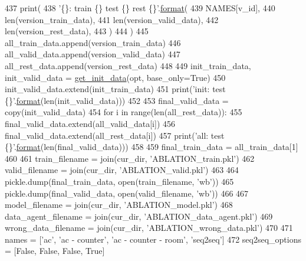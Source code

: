 \begin{DoxyCode}
437         print(
438             \textcolor{stringliteral}{'\{\}: train \{\} test \{\} rest \{\}'}.\hyperlink{namespaceparlai_1_1chat__service_1_1services_1_1messenger_1_1shared__utils_a32e2e2022b824fbaf80c747160b52a76}{format}(
439                 NAMES[v\_id],
440                 len(version\_train\_data),
441                 len(version\_valid\_data),
442                 len(version\_rest\_data),
443             )
444         )
445         all\_train\_data.append(version\_train\_data)
446         all\_valid\_data.append(version\_valid\_data)
447         all\_rest\_data.append(version\_rest\_data)
448 
449     init\_train\_data, init\_valid\_data = \hyperlink{namespaceprojects_1_1mastering__the__dungeon_1_1mturk_1_1tasks_1_1MTD_1_1run_ae84843b54586b020d47c60d95340e1d7}{get\_init\_data}(opt, base\_only=\textcolor{keyword}{True})
450     init\_valid\_data.extend(init\_train\_data)
451     print(\textcolor{stringliteral}{'init: test \{\}'}.\hyperlink{namespaceparlai_1_1chat__service_1_1services_1_1messenger_1_1shared__utils_a32e2e2022b824fbaf80c747160b52a76}{format}(len(init\_valid\_data)))
452 
453     final\_valid\_data = copy(init\_valid\_data)
454     \textcolor{keywordflow}{for} i \textcolor{keywordflow}{in} range(len(all\_rest\_data)):
455         final\_valid\_data.extend(all\_valid\_data[i])
456         final\_valid\_data.extend(all\_rest\_data[i])
457     print(\textcolor{stringliteral}{'all: test \{\}'}.\hyperlink{namespaceparlai_1_1chat__service_1_1services_1_1messenger_1_1shared__utils_a32e2e2022b824fbaf80c747160b52a76}{format}(len(final\_valid\_data)))
458 
459     final\_train\_data = all\_train\_data[1]
460 
461     train\_filename = join(cur\_dir, \textcolor{stringliteral}{'ABLATION\_train.pkl'})
462     valid\_filename = join(cur\_dir, \textcolor{stringliteral}{'ABLATION\_valid.pkl'})
463 
464     pickle.dump(final\_train\_data, open(train\_filename, \textcolor{stringliteral}{'wb'}))
465     pickle.dump(final\_valid\_data, open(valid\_filename, \textcolor{stringliteral}{'wb'}))
466 
467     model\_filename = join(cur\_dir, \textcolor{stringliteral}{'ABLATION\_model.pkl'})
468     data\_agent\_filename = join(cur\_dir, \textcolor{stringliteral}{'ABLATION\_data\_agent.pkl'})
469     wrong\_data\_filename = join(cur\_dir, \textcolor{stringliteral}{'ABLATION\_wrong\_data.pkl'})
470 
471     names = [\textcolor{stringliteral}{'ac'}, \textcolor{stringliteral}{'ac - counter'}, \textcolor{stringliteral}{'ac - counter - room'}, \textcolor{stringliteral}{'seq2seq'}]
472     seq2seq\_options = [\textcolor{keyword}{False}, \textcolor{keyword}{False}, \textcolor{keyword}{False}, \textcolor{keyword}{True}]

\end{DoxyCode}
